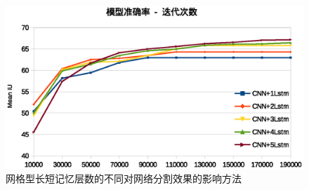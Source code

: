 \begin{figure}
	\centering
	\includegraphics[width=\textwidth]{figures/demo_images/result/combine.eps}
	\caption{网格型长短记忆层数的不同对网络分割效果的影响方法}
	\label{fig:trainingaccuracy}
\end{figure}
